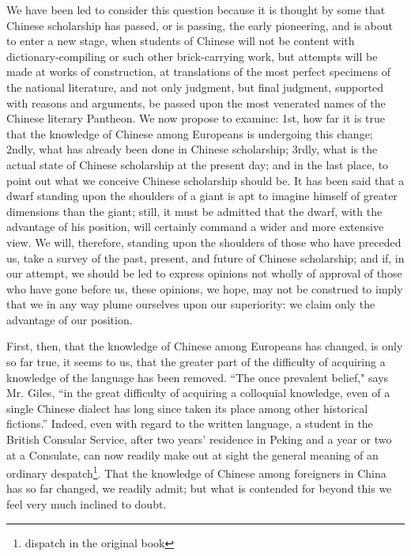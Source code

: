 We have been led to consider this question because it is thought by some that Chinese scholarship has passed, or is passing, the early pioneering, and is about to enter a new stage, when students of Chinese will not be content with dictionary-compiling or such other brick-carrying work, but attempts will be made at works of construction, at translations of the most perfect specimens of the national literature, and not only judgment, but final judgment, supported with reasons and arguments, be passed upon the most venerated names of the Chinese literary Pantheon.
We now propose to examine: 1st, how far it is true that the knowledge of Chinese among Europeans is undergoing this change; 
2ndly, what has already been done in Chinese scholarship; 
3rdly, what is the actual state of Chinese scholarship at the present day; and in the last place, to point out what we conceive Chinese scholarship should be.
It has been said that a dwarf standing upon the shoulders of a giant is apt to imagine himself of greater dimensions than the giant; still, it must be admitted that the dwarf, with the advantage of his position, will certainly command a wider and more extensive view.
We will, therefore, standing upon the shoulders of those who have preceded us, take a survey of the past, present, and future of Chinese scholarship; and if, in our attempt, we should be led to express opinions not wholly of approval of those who have gone before us, these opinions, we hope, may not be construed to imply that we in any way plume ourselves upon our superiority: we claim only the advantage of our position.

First, then, that the knowledge of Chinese among Europeans has changed, is only so far true, it seems to us, that the greater part of the difficulty of acquiring a knowledge of the language has been removed.
``The once prevalent belief," says Mr. Giles, ``in the great difficulty of acquiring a colloquial knowledge, even of a single Chinese dialect has long since taken its place among other historical fictions.''
Indeed, even with regard to the written language, a student in the British Consular Service, after two years' residence in Peking and a year or two at a Consulate, can now readily make out at sight the general meaning of an ordinary despatch\footnote{dispatch in the original book}.
That the knowledge of Chinese among foreigners in China has so far changed, we readily admit; but what is contended for beyond this we feel very much inclined to doubt.

